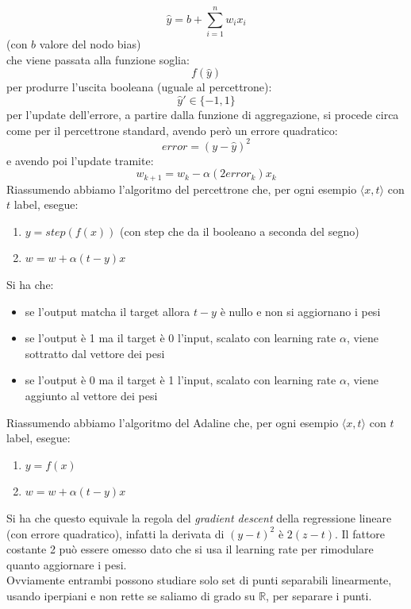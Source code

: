 					\[\hat{y}=b+\sum_{i=1}^nw_ix_i\]
					(con $b$ valore del nodo bias)\\
					che viene passata alla funzione soglia:
					\[f(\hat{y})\]
					per produrre l'uscita booleana (uguale al percettrone):
					\[\hat{y}'\in\{-1, 1\}\]
					per l'update dell'errore, a partire dalla funzione di aggregazione, si procede
					circa come per il percettrone standard, avendo però un errore quadratico:
					\[error=(y-\hat{y})^2\]
					e avendo poi l'update tramite:
					\[w_{k+1}=w_k-\alpha(2error_k)x_k\]
					Riassumendo abbiamo l'algoritmo del percettrone che, per ogni esempio $\langle
					x, t\rangle$ con $t$ label, esegue:
					\begin{enumerate}
						\item $y=step(f(x))$ (con step che da il booleano a seconda del segno)
						\item $w=w+\alpha(t-y)x$
					\end{enumerate}
					Si ha che:
					\begin{itemize}
						\item se l'output matcha il target allora $t-y$ è nullo e non si aggiornano i
						      pesi
						\item se l'output è 1 ma il target è 0 l'input, scalato con learning rate
						      $\alpha$, viene sottratto dal vettore dei pesi
						\item se l'output è 0 ma il target è 1 l'input, scalato con learning rate
						      $\alpha$, viene aggiunto al vettore dei pesi
					\end{itemize}
					Riassumendo abbiamo l'algoritmo del Adaline che, per ogni esempio $\langle
					x, t\rangle$ con $t$ label, esegue:
					\begin{enumerate}
						\item $y=f(x)$
						\item $w=w+\alpha(t-y)x$
					\end{enumerate}
					Si ha che questo equivale la regola del \textit{gradient descent} della
					regressione lineare (con errore quadratico), infatti la derivata di $(y-t)^2$ è
					$2(z-t)$. Il fattore costante 2 può essere omesso dato che si usa il learning
					rate per rimodulare quanto aggiornare i pesi.\\
					Ovviamente entrambi possono studiare solo set di punti separabili linearmente,
					usando iperpiani e non rette se saliamo di grado su $\mathbb{R}$, per separare i
					punti.
